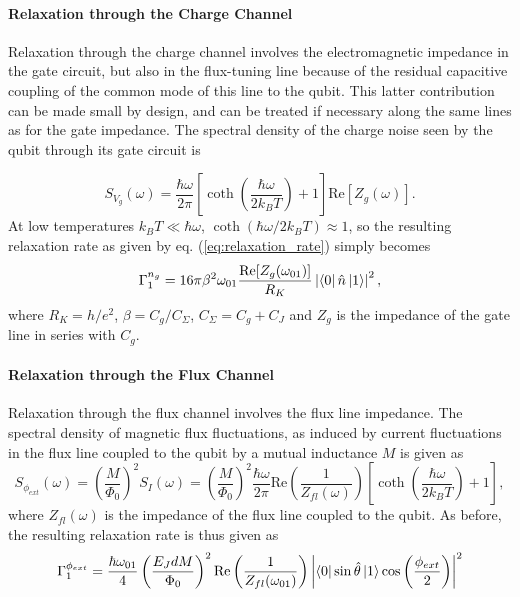 \paragraph{Relaxation through the Charge Channel}

 Relaxation through the charge channel involves the  electromagnetic impedance   in the gate circuit, but also in the flux-tuning 
line because of the residual capacitive coupling of the common mode of this line to the qubit. This latter contribution can  be made small 
by design, and can be treated if necessary along the same lines as for the gate impedance. The spectral density of the charge noise seen by  the qubit through its gate circuit is

%
\begin{equation}
S_{V_g}(\omega) = \frac{\hbar\omega}{2\pi}\left[\coth{\left(\frac{\hbar \omega}{2 k_B T}\right)}+1\right]\mathrm{Re}\left[Z_g(\omega)\right]. \label{eq:qubit_relaxation_svg}
\end{equation}
%
At low temperatures $k_B T \ll \hbar \omega$, $\coth{(\hbar\omega/2k_B T)}\approx 1$, so the resulting relaxation rate as given by eq. (\ref{eq:relaxation_rate}) simply becomes
%
\begin{equation}
\Gamma_1^{n_g} = 16\pi\beta^2\omega_{01}\frac{\mathrm{Re}[Z_g(\omega_{01})]}{R_K}\left|\left< 0 \right|\hat{n}\left| 1 \right>\right|^2, \label{eq:charge_relaxation_rate}
\end{equation}
%
where $R_K=h/e^2$, $\beta=C_g/C_\Sigma$, $C_\Sigma = C_g+C_J$ and $Z_g$ is the impedance of the gate line in series with $C_g$.

\paragraph{Relaxation through the Flux Channel}

Relaxation  through the flux channel involves the flux line impedance. 
The spectral density of magnetic flux fluctuations, as induced by current fluctuations in the flux line coupled to the qubit by a mutual inductance $M$ is given as
%
\begin{equation}
S_{\phi_{ext}}(\omega) = \left(\frac{M}{\Phi_0}\right)^2 S_I(\omega) = \left(\frac{M}{\Phi_0}\right)^2\frac{\hbar\omega}{2\pi}\mathrm{Re}\left(\frac{1}{Z_{fl}(\omega)}\right)\left[\coth{\left(\frac{\hbar\omega}{2k_B T}\right)}+1\right],
\end{equation}
%
where $Z_{fl}(\omega)$ is the impedance of the flux line coupled to the qubit. As before, the resulting relaxation rate is thus given as
%
\begin{equation}
\Gamma_1^{\phi_{ext}} = \frac{\hbar\omega_{01}}{4}\left(\frac{E_J d M}{\Phi_0}\right)^2 \mathrm{Re}\left(\frac{1}{Z_{fl}(\omega_{01})}\right)\left|\left< 0 \right|\sin{\hat{\theta}}\left| 1 \right>\cos{\left(\frac{\phi_{ext}}{2}\right)}\right|^2 \label{eq:flux_relaxation_rate}
\end{equation}
%

